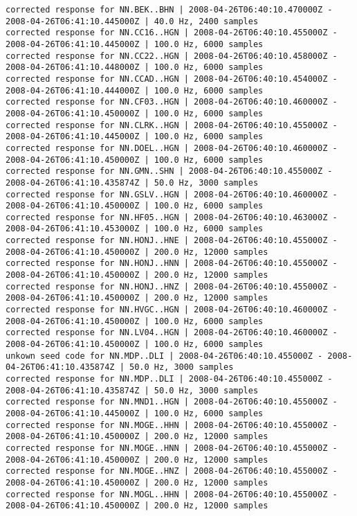 \documentclass[11pt]{article}
\begin{document}
    \begin{Verbatim}[commandchars=\\\{\}]
corrected response for NN.BEK..BHN | 2008-04-26T06:40:10.470000Z - 2008-04-26T06:41:10.445000Z | 40.0 Hz, 2400 samples
corrected response for NN.CC16..HGN | 2008-04-26T06:40:10.455000Z - 2008-04-26T06:41:10.445000Z | 100.0 Hz, 6000 samples
corrected response for NN.CC22..HGN | 2008-04-26T06:40:10.458000Z - 2008-04-26T06:41:10.448000Z | 100.0 Hz, 6000 samples
corrected response for NN.CCAD..HGN | 2008-04-26T06:40:10.454000Z - 2008-04-26T06:41:10.444000Z | 100.0 Hz, 6000 samples
corrected response for NN.CF03..HGN | 2008-04-26T06:40:10.460000Z - 2008-04-26T06:41:10.450000Z | 100.0 Hz, 6000 samples
corrected response for NN.CLRK..HGN | 2008-04-26T06:40:10.455000Z - 2008-04-26T06:41:10.445000Z | 100.0 Hz, 6000 samples
corrected response for NN.DOEL..HGN | 2008-04-26T06:40:10.460000Z - 2008-04-26T06:41:10.450000Z | 100.0 Hz, 6000 samples
corrected response for NN.GMN..SHN | 2008-04-26T06:40:10.455000Z - 2008-04-26T06:41:10.435874Z | 50.0 Hz, 3000 samples
corrected response for NN.GSLV..HGN | 2008-04-26T06:40:10.460000Z - 2008-04-26T06:41:10.450000Z | 100.0 Hz, 6000 samples
corrected response for NN.HF05..HGN | 2008-04-26T06:40:10.463000Z - 2008-04-26T06:41:10.453000Z | 100.0 Hz, 6000 samples
corrected response for NN.HONJ..HNE | 2008-04-26T06:40:10.455000Z - 2008-04-26T06:41:10.450000Z | 200.0 Hz, 12000 samples
corrected response for NN.HONJ..HNN | 2008-04-26T06:40:10.455000Z - 2008-04-26T06:41:10.450000Z | 200.0 Hz, 12000 samples
corrected response for NN.HONJ..HNZ | 2008-04-26T06:40:10.455000Z - 2008-04-26T06:41:10.450000Z | 200.0 Hz, 12000 samples
corrected response for NN.HVGC..HGN | 2008-04-26T06:40:10.460000Z - 2008-04-26T06:41:10.450000Z | 100.0 Hz, 6000 samples
corrected response for NN.LV04..HGN | 2008-04-26T06:40:10.460000Z - 2008-04-26T06:41:10.450000Z | 100.0 Hz, 6000 samples
unkown seed code for NN.MDP..DLI | 2008-04-26T06:40:10.455000Z - 2008-04-26T06:41:10.435874Z | 50.0 Hz, 3000 samples
corrected response for NN.MDP..DLI | 2008-04-26T06:40:10.455000Z - 2008-04-26T06:41:10.435874Z | 50.0 Hz, 3000 samples
corrected response for NN.MND1..HGN | 2008-04-26T06:40:10.455000Z - 2008-04-26T06:41:10.445000Z | 100.0 Hz, 6000 samples
corrected response for NN.MOGE..HHN | 2008-04-26T06:40:10.455000Z - 2008-04-26T06:41:10.450000Z | 200.0 Hz, 12000 samples
corrected response for NN.MOGE..HNN | 2008-04-26T06:40:10.455000Z - 2008-04-26T06:41:10.450000Z | 200.0 Hz, 12000 samples
corrected response for NN.MOGE..HNZ | 2008-04-26T06:40:10.455000Z - 2008-04-26T06:41:10.450000Z | 200.0 Hz, 12000 samples
corrected response for NN.MOGL..HHN | 2008-04-26T06:40:10.455000Z - 2008-04-26T06:41:10.450000Z | 200.0 Hz, 12000 samples

    \end{Verbatim}
\end{document}
